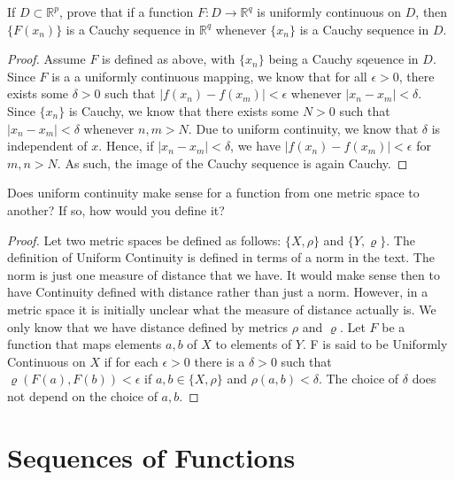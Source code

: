\documentclass[12pt]{book}
\newcommand{\R}{\mathbb{R}}
\newenvironment{exercise}[2][Exercise]{\begin{trivlist}
\item[\hskip \labelsep {\bfseries #1}\hskip \labelsep {\bfseries #2.}]}{\end{trivlist}}
\begin{document}
\begin{exercise}{8.2.11}
If $D \subset \R^p$, prove that if a function $F:D \to \R^q$ is uniformly continuous on $D$, then $\{F(x_n)\}$ is a Cauchy sequence in $\R^q$ whenever $\{x_n\}$ is a Cauchy sequence in $D$.

\begin{proof}
    Assume $F$ is defined as above, with $\{x_n\}$ being a Cauchy sqeuence in $D$. Since $F$ is a a uniformly continuous mapping, we know that for all $\epsilon > 0$, there exists some $\delta>0$ such that $\left| f(x_n) - f(x_m) \right| < \epsilon$ whenever $ \left| x_n - x_m \right| < \delta$. Since $\{x_n\}$ is Cauchy, we know that there exists some $N>0$ such that $\left| x_n - x_m \right| < \delta$ whenever $n,m > N$. Due to uniform continuity, we know that $\delta$ is independent of $x$. Hence, if $\left| x_n - x_m \right| < \delta$, we have $\left| f(x_n) - f(x_m) \right| < \epsilon$ for $m,n > N$. As such, the image of the Cauchy sequence is again Cauchy.
\end{proof}
\end{exercise}


\begin{exercise}{8.2.13}
Does uniform continuity make sense for a function from one metric space to another? If so, how would you define it?
\begin{proof}
Let two metric spaces be defined as follows: $\{X,\rho \}$ and $\{Y,\varrho \}$. The definition of Uniform Continuity is defined in terms of a norm in the text. The norm is just one measure of distance that we have. It would make sense then to have Continuity defined with distance rather than just a norm. However, in a metric space it is initially unclear what the measure of distance actually is. We only know that we have distance defined by metrics $\rho$ and $\varrho$. Let $F$ be a function that maps elements $a,b$ of $X$ to elements of $Y$. F is said to be Uniformly Continuous on $X$ if for each $\epsilon > 0$ there is a $\delta > 0$ such that $\varrho(F(a),F(b)) < \epsilon$ if $a,b \in \{X,\rho \}$ and $\rho(a,b) < \delta$. The choice of $\delta$ does not depend on the choice of $a,b$.
\end{proof}

\end{exercise}




\section{Sequences of Functions}
\end{document}
